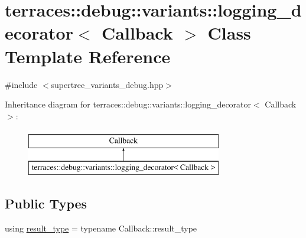 \hypertarget{classterraces_1_1debug_1_1variants_1_1logging__decorator}{}\section{terraces\+:\+:debug\+:\+:variants\+:\+:logging\+\_\+decorator$<$ Callback $>$ Class Template Reference}
\label{classterraces_1_1debug_1_1variants_1_1logging__decorator}


{\ttfamily \#include $<$supertree\+\_\+variants\+\_\+debug.\+hpp$>$}

Inheritance diagram for terraces\+:\+:debug\+:\+:variants\+:\+:logging\+\_\+decorator$<$ Callback $>$\+:\begin{figure}[H]
\begin{center}
\leavevmode
\includegraphics[height=2.000000cm]{classterraces_1_1debug_1_1variants_1_1logging__decorator}
\end{center}
\end{figure}
\subsection*{Public Types}
\begin{DoxyCompactItemize}
\item 
using \hyperlink{classterraces_1_1debug_1_1variants_1_1logging__decorator_a7c08c8ede1f8c884a3bab0437b244f55}{result\+\_\+type} = typename Callback\+::result\+\_\+type
\end{DoxyCompactItemize}
